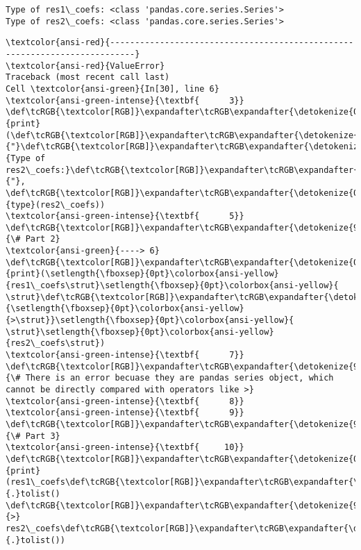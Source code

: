 \documentclass[11pt]{article}
\begin{document}
    \begin{Verbatim}[commandchars=\\\{\}]
Type of res1\_coefs: <class 'pandas.core.series.Series'>
Type of res2\_coefs: <class 'pandas.core.series.Series'>
    \end{Verbatim}

    \begin{Verbatim}[commandchars=\\\{\}, frame=single, framerule=2mm, rulecolor=\color{outerrorbackground}]
\textcolor{ansi-red}{---------------------------------------------------------------------------}
\textcolor{ansi-red}{ValueError}                                Traceback (most recent call last)
Cell \textcolor{ansi-green}{In[30], line 6}
\textcolor{ansi-green-intense}{\textbf{      3}} \def\tcRGB{\textcolor[RGB]}\expandafter\tcRGB\expandafter{\detokenize{0,135,0}}{print}(\def\tcRGB{\textcolor[RGB]}\expandafter\tcRGB\expandafter{\detokenize{175,0,0}}{"}\def\tcRGB{\textcolor[RGB]}\expandafter\tcRGB\expandafter{\detokenize{175,0,0}}{Type of res2\_coefs:}\def\tcRGB{\textcolor[RGB]}\expandafter\tcRGB\expandafter{\detokenize{175,0,0}}{"}, \def\tcRGB{\textcolor[RGB]}\expandafter\tcRGB\expandafter{\detokenize{0,135,0}}{type}(res2\_coefs))
\textcolor{ansi-green-intense}{\textbf{      5}} \def\tcRGB{\textcolor[RGB]}\expandafter\tcRGB\expandafter{\detokenize{95,135,135}}{\# Part 2}
\textcolor{ansi-green}{----> 6} \def\tcRGB{\textcolor[RGB]}\expandafter\tcRGB\expandafter{\detokenize{0,135,0}}{print}(\setlength{\fboxsep}{0pt}\colorbox{ansi-yellow}{res1\_coefs\strut}\setlength{\fboxsep}{0pt}\colorbox{ansi-yellow}{ \strut}\def\tcRGB{\textcolor[RGB]}\expandafter\tcRGB\expandafter{\detokenize{98,98,98}}{\setlength{\fboxsep}{0pt}\colorbox{ansi-yellow}{>\strut}}\setlength{\fboxsep}{0pt}\colorbox{ansi-yellow}{ \strut}\setlength{\fboxsep}{0pt}\colorbox{ansi-yellow}{res2\_coefs\strut})
\textcolor{ansi-green-intense}{\textbf{      7}} \def\tcRGB{\textcolor[RGB]}\expandafter\tcRGB\expandafter{\detokenize{95,135,135}}{\# There is an error becuase they are pandas series object, which cannot be directly compared with operators like >}
\textcolor{ansi-green-intense}{\textbf{      8}} 
\textcolor{ansi-green-intense}{\textbf{      9}} \def\tcRGB{\textcolor[RGB]}\expandafter\tcRGB\expandafter{\detokenize{95,135,135}}{\# Part 3}
\textcolor{ansi-green-intense}{\textbf{     10}} \def\tcRGB{\textcolor[RGB]}\expandafter\tcRGB\expandafter{\detokenize{0,135,0}}{print}(res1\_coefs\def\tcRGB{\textcolor[RGB]}\expandafter\tcRGB\expandafter{\detokenize{98,98,98}}{.}tolist() \def\tcRGB{\textcolor[RGB]}\expandafter\tcRGB\expandafter{\detokenize{98,98,98}}{>} res2\_coefs\def\tcRGB{\textcolor[RGB]}\expandafter\tcRGB\expandafter{\detokenize{98,98,98}}{.}tolist())


\end{Verbatim}
\end{document}
